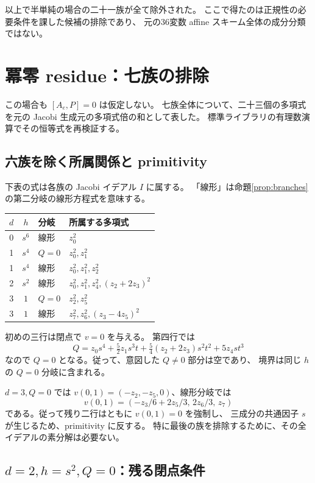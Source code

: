 \documentclass[11pt,a4paper]{ltjsarticle}
\theoremstyle{remark}\newtheorem{remark}[theorem]{注意}
\begin{document}
以上で半単純の場合の二十一族が全て除外された。
ここで得たのは正規性の必要条件を課した候補の排除であり、
元の36変数 affine スキーム全体の成分分類ではない。



\section{冪零 residue：七族の排除}\label{sec:nilpotent}

この場合も $[A_e,P]=0$ は仮定しない。
七族全体について、二十三個の多項式を元の Jacobi 生成元の多項式倍の和として表した。
標準ライブラリの有理数演算でその恒等式を再検証する。

\subsection{六族を除く所属関係と primitivity}

下表の式は各族の Jacobi イデアル $I$ に属する。
「線形」は命題\ref{prop:branches}の第二分岐の線形方程式を意味する。
\begin{center}
\begin{tabular}{ccll}
\toprule
$d$ & $h$ & 分岐 & 所属する多項式\\\midrule
0 & $s^6$ & 線形 & $z_0^2$\\
1 & $s^4$ & $Q=0$ & $z_0^2,z_1^2$\\
1 & $s^4$ & 線形 & $z_0^2,z_1^2,z_2^2$\\
2 & $s^2$ & 線形 & $z_0^2,z_1^2,z_4^2,(z_2+2z_3)^2$\\
3 & $1$ & $Q=0$ & $z_2^2,z_5^2$\\
3 & $1$ & 線形 & $z_7^2,z_6^2,(z_3-4z_5)^2$\\\bottomrule
\end{tabular}
\end{center}
初めの三行は閉点で $v=0$ を与える。
第四行では
\[
 Q=z_0s^4+\tfrac52z_1s^3t+\tfrac54(z_2+2z_3)s^2t^2+5z_4st^3
\]
なので $Q=0$ となる。従って、意図した $Q\ne0$ 部分は空であり、
境界は同じ $h$ の $Q=0$ 分岐に含まれる。

$d=3,Q=0$ では $v(0,1)=(-z_2,-z_5,0)$、線形分岐では
\[
                   v(0,1)=(-z_3/6+2z_5/3,\,2z_6/3,\,z_7)
\]
である。従って残り二行はともに $v(0,1)=0$ を強制し、
三成分の共通因子 $s$ が生じるため、primitivity に反する。
特に最後の族を排除するために、その全イデアルの素分解は必要ない。

\subsection{\texorpdfstring{$d=2,h=s^2,Q=0$}{d=2, h=s2, Q=0}：残る閉点条件}
\end{document}
